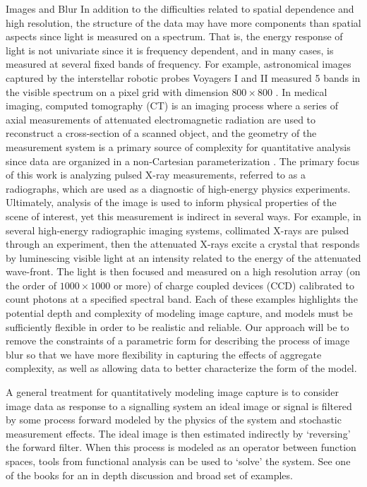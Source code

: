 \begin{chapter}{Images and Blur}
  In addition to the difficulties related to spatial dependence and high resolution, the structure of the data may have more components than spatial aspects since light is measured on a spectrum.
  That is, the energy response of light is not univariate since it is frequency dependent, and in many cases, is measured at several fixed bands of frequency.
  For example, astronomical images captured by the interstellar robotic probes Voyagers I and II measured 5 bands in the visible spectrum on a pixel grid with dimension $800 \times 800$ \citep{voyager}.
  In medical imaging, computed tomography (CT) is an imaging process where a series of axial measurements of attenuated electromagnetic radiation are used to reconstruct a cross-section of a scanned object, and the geometry of the measurement system is a primary source of complexity for quantitative analysis since data are organized in a non-Cartesian parameterization \citep{epstein2008}.
  The primary focus of this work is analyzing pulsed X-ray measurements, referred to as a radiographs, which are used as a diagnostic of high-energy physics experiments.  
  Ultimately, analysis of the image is used to inform physical properties of the scene of interest, yet this measurement is indirect in several ways. 
  For example, in several high-energy radiographic imaging systems, collimated X-rays are pulsed through an experiment, then the attenuated X-rays excite a crystal that responds by luminescing visible light at an intensity related to the energy of the attenuated wave-front.  
  The light is then focused and measured on a high resolution array (on the order of $1000\times1000$ or more) of charge coupled devices (CCD) calibrated to count photons at a specified spectral band.
  Each of these examples highlights the potential depth and complexity of modeling image capture, and models must be sufficiently flexible in order to be realistic and reliable.
  Our approach will be to remove the constraints of a parametric form for describing the process of image blur so that we have more flexibility in capturing the effects of aggregate complexity, as well as allowing data to better characterize the form of the model. 

A general treatment for quantitatively modeling image capture is to consider image data as response to a signalling system an ideal image or signal is filtered by some process forward modeled by the physics of the system and stochastic measurement effects. %
The ideal image is then estimated indirectly by `reversing' the forward filter. 
When this process is modeled as an operator between function spaces, tools from functional analysis can be used to `solve' the system.
See one of the books \citep{vogel2002,epstein2008} for an in depth discussion and broad set of examples.


\end{chapter}
